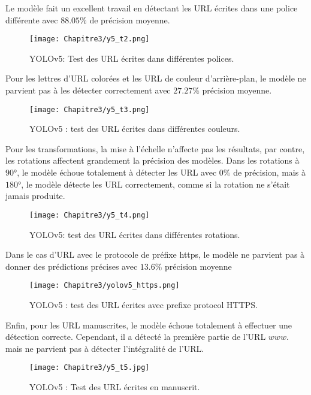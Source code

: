           Le modèle fait un excellent travail en détectant les URL écrites dans une police différente avec $88.05\%$ de précision moyenne.
          \begin{figure}[H]
                    \centering
                    \texttt{[image: Chapitre3/y5\_t2.png]}
                    \caption{YOLOv5: Test des URL écrites dans différentes polices.}
                    \label{y5_t2}
                    \end{figure}

          Pour les lettres d'URL colorées et les URL de couleur d'arrière-plan, le modèle ne parvient pas à les détecter correctement avec $27.27\%$ précision moyenne.
          \begin{figure}[H]
                    \centering
                    \texttt{[image: Chapitre3/y5\_t3.png]}
                    \caption{YOLOv5 : test des URL écrites dans différentes couleurs.}
                    \label{y5_t3}
                    \end{figure}

          Pour les transformations, la mise à l'échelle n'affecte pas les résultats, par contre, les rotations affectent grandement la précision des modèles. Dans les rotations à $90 °$, le modèle échoue totalement à détecter les URL avec $0\%$ de précision, mais à $180 °$, le modèle détecte les URL correctement, comme si la rotation ne s'était jamais produite.
          \begin{figure}[H]
                    \centering
                    \texttt{[image: Chapitre3/y5\_t4.png]}
                    \caption{YOLOv5: test des URL écrites dans différentes rotations.}
                    \label{y5_t4}
                    \end{figure}
               
          Dans le cas d'URL avec le protocole de préfixe https, le modèle ne parvient pas à donner des prédictions précises avec $13.6\%$ précision moyenne
          \begin{figure}[H]
                    \centering
                    \texttt{[image: Chapitre3/yolov5\_https.png]}
                    \caption{YOLOv5 : test des URL écrites avec prefixe protocol HTTPS.}
                    \label{y5_https}
                    \end{figure}
               

          Enfin, pour les URL manuscrites, le modèle échoue totalement à effectuer une détection correcte. Cependant, il a détecté la première partie de l'URL $www.$ mais ne parvient pas à détecter l'intégralité de l'URL.
          \begin{figure}[H]
                    \centering
                    \texttt{[image: Chapitre3/y5\_t5.jpg]}
                    \caption{YOLOv5 : Test des URL écrites en manuscrit.}
                    \label{y5_t5}
                    \end{figure}

